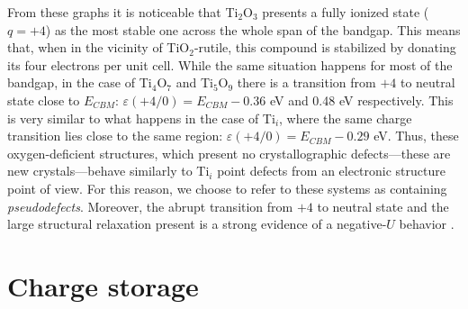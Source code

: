 From these graphs it is noticeable that Ti$_2$O$_3$ presents a fully ionized state ($q = +4$) as the most stable one across the whole span of the bandgap. This means that, when in the vicinity of TiO$_2$-rutile, this compound is stabilized by donating its four electrons per unit cell. While the same situation happens for most of the bandgap, in the case of Ti$_4$O$_7$ and Ti$_5$O$_9$ there is a transition from $+4$ to neutral state close to $E_{CBM}$: $\varepsilon(+4/0) = E_{CBM} - 0.36$ eV and 0.48 eV respectively. This is very similar to what happens in the case of Ti$_i$, where the same charge transition lies close to the same region: $\varepsilon(+4/0) = E_{CBM} - 0.29$ eV. Thus, these oxygen-deficient structures, which present no crystallographic defects---these are new crystals---behave similarly to Ti$_i$ point defects from an electronic structure point of view. For this reason, we choose to refer to these systems as containing \textit{pseudodefects}. Moreover, the abrupt transition from  $+4$ to neutral state and the large structural relaxation present is a strong evidence of a negative-$U$ behavior \cite{Watkins1984}.

\section{Charge storage}
\label{sec:charge-storage}


